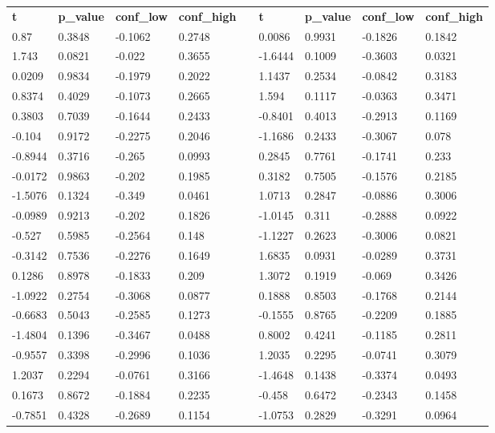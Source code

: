 \begin{table}[h!]
\small
\begin{tabular}{lllllllll}
\textbf{t} & \textbf{p\_value} & \textbf{conf\_low} & \textbf{conf\_high} &  & \textbf{t} & \textbf{p\_value} & \textbf{conf\_low} & \textbf{conf\_high} \\ \cline{1-4} \cline{6-9} 
0.87 & 0.3848 & -0.1062 & 0.2748 &  & 0.0086 & 0.9931 & -0.1826 & 0.1842 \\
1.743 & 0.0821 & -0.022 & 0.3655 &  & -1.6444 & 0.1009 & -0.3603 & 0.0321 \\
0.0209 & 0.9834 & -0.1979 & 0.2022 &  & 1.1437 & 0.2534 & -0.0842 & 0.3183 \\
0.8374 & 0.4029 & -0.1073 & 0.2665 &  & 1.594 & 0.1117 & -0.0363 & 0.3471 \\
0.3803 & 0.7039 & -0.1644 & 0.2433 &  & -0.8401 & 0.4013 & -0.2913 & 0.1169 \\
-0.104 & 0.9172 & -0.2275 & 0.2046 &  & -1.1686 & 0.2433 & -0.3067 & 0.078 \\
-0.8944 & 0.3716 & -0.265 & 0.0993 &  & 0.2845 & 0.7761 & -0.1741 & 0.233 \\
-0.0172 & 0.9863 & -0.202 & 0.1985 &  & 0.3182 & 0.7505 & -0.1576 & 0.2185 \\
-1.5076 & 0.1324 & -0.349 & 0.0461 &  & 1.0713 & 0.2847 & -0.0886 & 0.3006 \\
-0.0989 & 0.9213 & -0.202 & 0.1826 &  & -1.0145 & 0.311 & -0.2888 & 0.0922 \\
-0.527 & 0.5985 & -0.2564 & 0.148 &  & -1.1227 & 0.2623 & -0.3006 & 0.0821 \\
-0.3142 & 0.7536 & -0.2276 & 0.1649 &  & 1.6835 & 0.0931 & -0.0289 & 0.3731 \\
0.1286 & 0.8978 & -0.1833 & 0.209 &  & 1.3072 & 0.1919 & -0.069 & 0.3426 \\
-1.0922 & 0.2754 & -0.3068 & 0.0877 &  & 0.1888 & 0.8503 & -0.1768 & 0.2144 \\
-0.6683 & 0.5043 & -0.2585 & 0.1273 &  & -0.1555 & 0.8765 & -0.2209 & 0.1885 \\
-1.4804 & 0.1396 & -0.3467 & 0.0488 &  & 0.8002 & 0.4241 & -0.1185 & 0.2811 \\
-0.9557 & 0.3398 & -0.2996 & 0.1036 &  & 1.2035 & 0.2295 & -0.0741 & 0.3079 \\
1.2037 & 0.2294 & -0.0761 & 0.3166 &  & -1.4648 & 0.1438 & -0.3374 & 0.0493 \\
0.1673 & 0.8672 & -0.1884 & 0.2235 &  & -0.458 & 0.6472 & -0.2343 & 0.1458 \\
-0.7851 & 0.4328 & -0.2689 & 0.1154 &  & -1.0753 & 0.2829 & -0.3291 & 0.0964 \\

\end{tabular}
\end{table}
